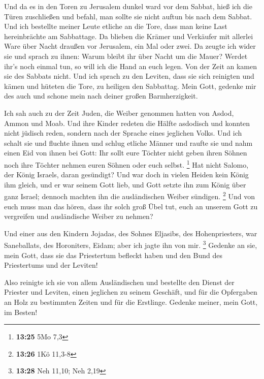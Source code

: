  Und da es in den Toren zu Jerusalem dunkel ward vor dem
Sabbat, hieß ich die Türen zuschließen und befahl, man sollte sie nicht
auftun bis nach dem Sabbat. Und ich bestellte meiner Leute etliche an
die Tore, dass man keine Last hereinbrächte am Sabbattage. 
Da blieben die Krämer und Verkäufer mit allerlei Ware über Nacht draußen
vor Jerusalem, ein Mal oder zwei.  Da zeugte ich wider sie
und sprach zu ihnen: Warum bleibt ihr über Nacht um die Mauer? Werdet
ihr's noch einmal tun, so will ich die Hand an euch legen. Von der Zeit
an kamen sie des Sabbats nicht.  Und ich sprach zu den
Leviten, dass sie sich reinigten und kämen und hüteten die Tore, zu
heiligen den Sabbattag. Mein Gott, gedenke mir des auch und schone mein
nach deiner großen Barmherzigkeit.

 Ich sah auch zu der Zeit Juden, die Weiber genommen hatten
von Asdod, Ammon und Moab.  Und ihre Kinder redeten die
Hälfte asdodisch und konnten nicht jüdisch reden, sondern nach der
Sprache eines jeglichen Volks.  Und ich schalt sie und
fluchte ihnen und schlug etliche Männer und raufte sie und nahm einen
Eid von ihnen bei Gott: Ihr sollt eure Töchter nicht geben ihren Söhnen
noch ihre Töchter nehmen euren Söhnen oder euch selbst. \footnote{\textbf{13:25}
  5Mo 7,3}  Hat nicht Salomo, der König Israels, daran
gesündigt? Und war doch in vielen Heiden kein König ihm gleich, und er
war seinem Gott lieb, und Gott setzte ihn zum König über ganz Israel;
dennoch machten ihn die ausländischen Weiber sündigen. \footnote{\textbf{13:26}
  1Kö 11,3-8}  Und von euch muss man das hören, dass ihr
solch groß Übel tut, euch an unserem Gott zu vergreifen und ausländische
Weiber zu nehmen?

 Und einer aus den Kindern Jojadas, des Sohnes Eljasibs,
des Hohenpriesters, war Saneballats, des Horoniters, Eidam; aber ich
jagte ihn von mir. \footnote{\textbf{13:28} Neh 11,10; Neh 2,19}
 Gedenke an sie, mein Gott, dass sie das Priestertum
befleckt haben und den Bund des Priestertums und der Leviten!

 Also reinigte ich sie von allem Ausländischen und
bestellte den Dienst der Priester und Leviten, einen jeglichen zu seinem
Geschäft,  und für die Opfergaben an Holz zu bestimmten
Zeiten und für die Erstlinge. Gedenke meiner, mein Gott, im Besten!
